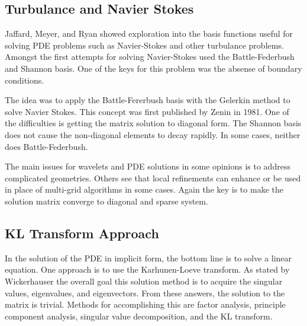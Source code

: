 

\subsection {Turbulance and Navier Stokes}
Jaffard, Meyer, and Ryan showed exploration into the basis functions useful for solving PDE problems such as Navier-Stokes and other turbulance problems.  Amongst the first attempts for solving Navier-Stokes used the Battle-Federbush and Shannon basis.  One of the keys for this problem was the absense of boundary conditions.  

The idea was to apply the Battle-Fererbush basis with the Gelerkin method to solve Navier Stokes.  This concept was first published by Zenin in 1981.  One of the difficulties is getting the matrix solution to diagonal form.  The Shannon basis does not cause the non-diagonal elements to decay rapidly.  In some cases, neither does Battle-Federbush.  

The main issues for wavelets and PDE solutions in some opinions is to address complicated geometries.  Others see that local refinements can enhance or be used in place of multi-grid algorithms in some cases.   Again the key is to make the solution matrix converge to diagonal and sparse system.  


\subsection {KL Transform Approach}
In the solution of the PDE in implicit form, the bottom line is to solve a linear equation.  One approach is to use the Karhunen-Loeve transform.   As stated by Wickerhauser \cite{victor} the overall goal this solution method is to acquire the singular values, eigenvalues, and eigenvectors.  From these answers, the solution to the matrix is trivial.  Methods for accomplishing this are factor analysis, principle component analysis, singular value decomposition, and the KL transform.  

